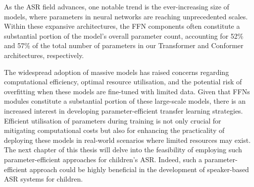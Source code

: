 As the \ac{ASR} field advances, one notable trend is the ever-increasing size of models, where parameters in neural networks are reaching unprecedented scales. 
Within these expansive architectures, the \ac{FFN} components often constitute a substantial portion of the model's overall parameter count, accounting for 52\% and 57\% of the total number of parameters in our Transformer and Conformer architectures, respectively.

The widespread adoption of massive models has raised concerns regarding computational efficiency, optimal resource utilisation, and the potential risk of overfitting when these models are fine-tuned with limited data. Given that \ac{FFN}s modules constitute a substantial portion of these large-scale models, there is an increased interest in developing parameter-efficient transfer learning strategies. Efficient utilisation of parameters during training is not only crucial for mitigating computational costs but also for enhancing the practicality of deploying these models in real-world scenarios where limited resources may exist.
The next chapter of this thesis will delve into the feasibility of employing such parameter-efficient approaches for children's \ac{ASR}. Indeed, such a parameter-efficient approach could be highly beneficial in the development of speaker-based \ac{ASR} systems for children. 